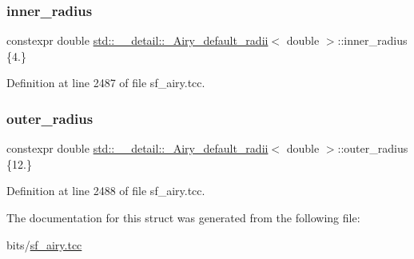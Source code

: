\subsubsection{\texorpdfstring{inner\+\_\+radius}{inner\_radius}}
{\footnotesize\ttfamily constexpr double \hyperlink{structstd_1_1____detail_1_1__Airy__default__radii}{std\+::\+\_\+\+\_\+detail\+::\+\_\+\+Airy\+\_\+default\+\_\+radii}$<$ double $>$\+::inner\+\_\+radius \{4.\}\hspace{0.3cm}{\ttfamily [static]}}



Definition at line 2487 of file sf\+\_\+airy.\+tcc.

\mbox{\label{structstd_1_1____detail_1_1__Airy__default__radii_3_01double_01_4_a0d0c981d84c034afb18aa533bd6a9a52}} 
\subsubsection{\texorpdfstring{outer\+\_\+radius}{outer\_radius}}
{\footnotesize\ttfamily constexpr double \hyperlink{structstd_1_1____detail_1_1__Airy__default__radii}{std\+::\+\_\+\+\_\+detail\+::\+\_\+\+Airy\+\_\+default\+\_\+radii}$<$ double $>$\+::outer\+\_\+radius \{12.\}\hspace{0.3cm}{\ttfamily [static]}}



Definition at line 2488 of file sf\+\_\+airy.\+tcc.



The documentation for this struct was generated from the following file\+:\begin{DoxyCompactItemize}
\item 
bits/\hyperlink{sf__airy_8tcc}{sf\+\_\+airy.\+tcc}\end{DoxyCompactItemize}
